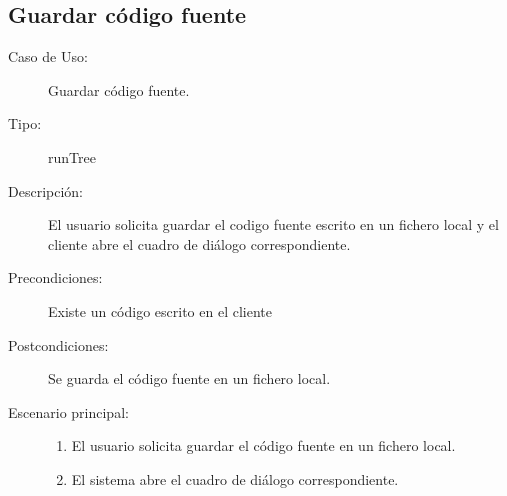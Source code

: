 \subsection{Guardar código fuente} 
\begin{framed}
\FloatBarrier
\begin{description}
   \item[Caso de Uso:] Guardar código fuente.
   \item [Tipo:] runTree
   \item[Descripción:] 
   El usuario solicita guardar el codigo fuente escrito en un fichero local y el cliente
   abre el cuadro de diálogo correspondiente.
   \item[Precondiciones:]
   Existe un código escrito en el cliente 
   \item[Postcondiciones:] 
   Se guarda el código fuente en un fichero local.
   \item[Escenario principal:] \hfill
   \begin{enumerate}
   \item El usuario solicita guardar el código fuente en un fichero local.
   \item El sistema abre el cuadro de diálogo correspondiente.
   \end{enumerate}
\end{description}
 \FloatBarrier
\end{framed}

